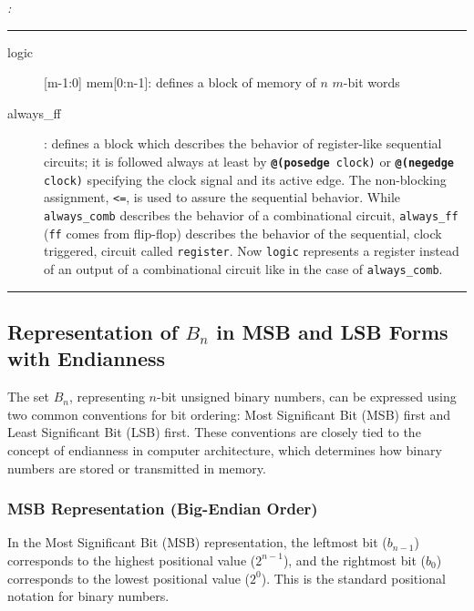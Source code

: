 \begin{verisum}{\em :

\hspace{-0.8cm} \rule[5mm]{16cm}{0.25mm} \vspace{-0.7cm}

\begin{description}
    \item[logic] [m-1:0] mem[0:n-1]: defines a block of memory of $n$ $m$-bit words
    \item[always\_ff]: defines a block which describes the behavior of register-like sequential circuits; it is followed always at least by {\tt {\bf @(posedge} clock)} or {\tt {\bf @(negedge} clock)} specifying the clock signal and its active edge. The non-blocking assignment, {\tt <=}, is used to assure the sequential behavior. While {\tt always\_comb} describes the behavior of a combinational circuit, {\tt always\_ff} ({\tt ff} comes from flip-flop) describes the behavior of the sequential, clock triggered, circuit called {\tt register}. Now {\tt logic} represents a register instead of an output of a combinational circuit like in the case of {\tt always\_comb}.
\end{description}
\rule[5mm]{16cm}{0.25mm} }
\end{verisum}


\subsection{Representation of \( B_n \) in MSB and LSB Forms with Endianness}
The set \( B_n \), representing \( n \)-bit unsigned binary numbers, can be expressed using two common conventions for bit ordering: Most Significant Bit (MSB) first and Least Significant Bit (LSB) first. These conventions are closely tied to the concept of endianness in computer architecture, which determines how binary numbers are stored or transmitted in memory.

\subsubsection{MSB Representation (Big-Endian Order)}
In the Most Significant Bit (MSB) representation, the leftmost bit (\( b_{n-1} \)) corresponds to the highest positional value (\( 2^{n-1} \)), and the rightmost bit (\( b_0 \)) corresponds to the lowest positional value (\( 2^0 \)). This is the standard positional notation for binary numbers. 

